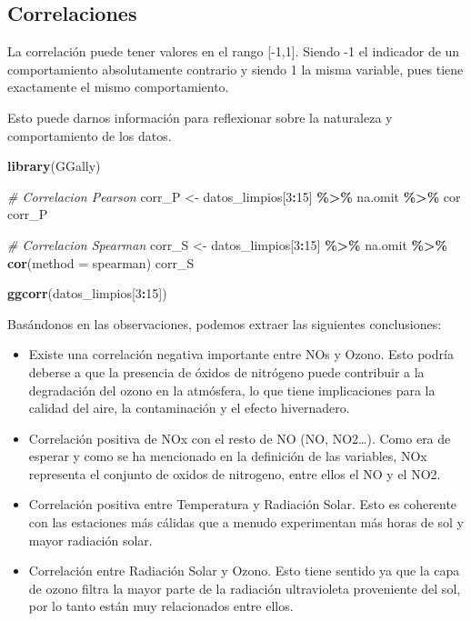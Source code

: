 \documentclass[notspecified,article,submit,moreauthors,pdftex]{Definitions/mdpi}
\newenvironment{Shaded}{\begin{snugshade}}{\end{snugshade}}
\newcommand{\AttributeTok}[1]{\textcolor[rgb]{0.13,0.29,0.53}{#1}}
\newcommand{\CommentTok}[1]{\textcolor[rgb]{0.56,0.35,0.01}{\textit{#1}}}
\newcommand{\DecValTok}[1]{\textcolor[rgb]{0.00,0.00,0.81}{#1}}
\newcommand{\FunctionTok}[1]{\textcolor[rgb]{0.13,0.29,0.53}{\textbf{#1}}}
\newcommand{\NormalTok}[1]{#1}
\newcommand{\OtherTok}[1]{\textcolor[rgb]{0.56,0.35,0.01}{#1}}
\newcommand{\SpecialCharTok}[1]{\textcolor[rgb]{0.81,0.36,0.00}{\textbf{#1}}}
\newcommand{\StringTok}[1]{\textcolor[rgb]{0.31,0.60,0.02}{#1}}
\begin{document}
\hypertarget{correlaciones}{%
\subsection{Correlaciones}\label{correlaciones}}

La correlación puede tener valores en el rango {[}-1,1{]}. Siendo -1 el
indicador de un comportamiento absolutamente contrario y siendo 1 la
misma variable, pues tiene exactamente el mismo comportamiento.

Esto puede darnos información para reflexionar sobre la naturaleza y
comportamiento de los datos.

\begin{Shaded}
\begin{Highlighting}[]
\FunctionTok{library}\NormalTok{(GGally)}

\CommentTok{\# Correlacion Pearson}
\NormalTok{corr\_P }\OtherTok{\textless{}{-}}\NormalTok{ datos\_limpios[}\DecValTok{3}\SpecialCharTok{:}\DecValTok{15}\NormalTok{] }\SpecialCharTok{\%\textgreater{}\%}
\NormalTok{  na.omit }\SpecialCharTok{\%\textgreater{}\%}
\NormalTok{  cor}
\NormalTok{corr\_P}

\CommentTok{\# Correlacion Spearman}
\NormalTok{corr\_S }\OtherTok{\textless{}{-}}\NormalTok{ datos\_limpios[}\DecValTok{3}\SpecialCharTok{:}\DecValTok{15}\NormalTok{] }\SpecialCharTok{\%\textgreater{}\%}
\NormalTok{  na.omit }\SpecialCharTok{\%\textgreater{}\%}
  \FunctionTok{cor}\NormalTok{(}\AttributeTok{method =} \StringTok{\textquotesingle{}spearman\textquotesingle{}}\NormalTok{)}
\NormalTok{corr\_S}

\FunctionTok{ggcorr}\NormalTok{(datos\_limpios[}\DecValTok{3}\SpecialCharTok{:}\DecValTok{15}\NormalTok{])}
\end{Highlighting}
\end{Shaded}

Basándonos en las observaciones, podemos extraer las siguientes
conclusiones:

\begin{itemize}
\item
  Existe una correlación negativa importante entre NOs y Ozono. Esto
  podría deberse a que la presencia de óxidos de nitrógeno puede
  contribuir a la degradación del ozono en la atmósfera, lo que tiene
  implicaciones para la calidad del aire, la contaminación y el efecto
  hivernadero.
\item
  Correlación positiva de NOx con el resto de NO (NO, NO2\ldots). Como
  era de esperar y como se ha mencionado en la definición de las
  variables, NOx representa el conjunto de oxidos de nitrogeno, entre
  ellos el NO y el NO2.
\item
  Correlación positiva entre Temperatura y Radiación Solar. Esto es
  coherente con las estaciones más cálidas que a menudo experimentan más
  horas de sol y mayor radiación solar.
\item
  Correlación entre Radiación Solar y Ozono. Esto tiene sentido ya que
  la capa de ozono filtra la mayor parte de la radiación ultravioleta
  proveniente del sol, por lo tanto están muy relacionados entre ellos.
\end{itemize}
\end{document}
